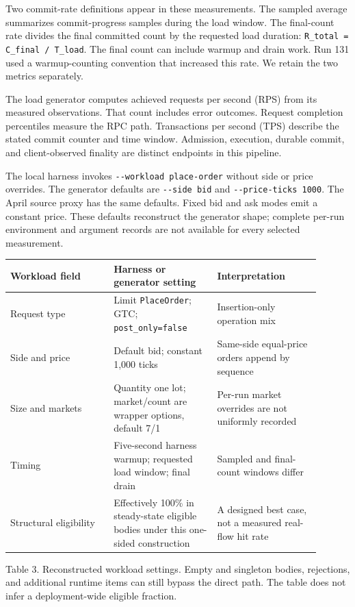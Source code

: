 \documentclass[11pt]{article}
\begin{document}
Two commit-rate definitions appear in these measurements. The sampled average summarizes commit-progress samples during the load window. The final-count rate divides the final committed count by the requested load duration: \texttt{R\_\allowbreak total = C\_\allowbreak final / T\_\allowbreak load}. The final count can include warmup and drain work. Run 131 used a warmup-counting convention that increased this rate. We retain the two metrics separately. \cite{R13}

The load generator computes achieved requests per second (RPS) from its measured observations. That count includes error outcomes. Request completion percentiles measure the RPC path. Transactions per second (TPS) describe the stated commit counter and time window. Admission, execution, durable commit, and client-observed finality are distinct endpoints in this pipeline. \cite{R12,R13}

The local harness invokes \texttt{-{}-workload place-order} without side or price overrides. The generator defaults are \texttt{-{}-side bid} and \texttt{-{}-price-ticks 1000}. The April source proxy has the same defaults. Fixed bid and ask modes emit a constant price. These defaults reconstruct the generator shape; complete per-run environment and argument records are not available for every selected measurement. \cite{R29}

{\small\begin{longtable}{@{}p{0.300\linewidth}p{0.300\linewidth}p{0.300\linewidth}@{}}
\toprule
Workload field & Harness or generator setting & Interpretation \\
\midrule
\endhead
Request type & Limit \texttt{PlaceOrder}; GTC; \texttt{post\_\allowbreak only=false} & Insertion-only operation mix \\
Side and price & Default bid; constant 1,000 ticks & Same-side equal-price orders append by sequence \\
Size and markets & Quantity one lot; market/count are wrapper options, default 7/1 & Per-run market overrides are not uniformly recorded \\
Timing & Five-second harness warmup; requested load window; final drain & Sampled and final-count windows differ \\
Structural eligibility & Effectively 100\% in steady-state eligible bodies under this one-sided construction & A designed best case, not a measured real-flow hit rate \\
\bottomrule
\end{longtable}}
Table 3. Reconstructed workload settings. Empty and singleton bodies, rejections, and additional runtime items can still bypass the direct path. The table does not infer a deployment-wide eligible fraction. \cite{R29}
\end{document}
